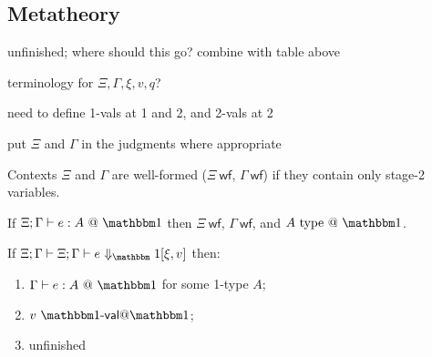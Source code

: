 \subsection{Metatheory}

\TODO unfinished; where should this go? combine with table above

\noindent\TODO terminology for $\Xi,\Gamma,\xi,v,q$?

\noindent\TODO need to define 1-vals at 1 and 2, and 2-vals at 2

\noindent\TODO put $\Xi$ and $\Gamma$ in the judgments where appropriate

\newcommand{\wf}{\ \mathsf{wf}}
\newcommand{\dom}[1]{\mathsf{dom}(#1)}
\newcommand{\valoo}{\ \bbone\textsf{-}\mathsf{val} @ \bbone}
\newcommand{\valot}{\ \bbone\textsf{-}\mathsf{val} @ \bbtwo}
\newcommand{\valtt}{\ \bbtwo\textsf{-}\mathsf{val} @ \bbtwo}

\begin{definition}
Contexts $\Xi$ and $\Gamma$ are well-formed ($\Xi\wf$, $\Gamma\wf$) if they
contain only stage-2 variables.
\end{definition}

\begin{theorem}
If $\Xi;\typesone e A$ then $\Xi\wf$, $\Gamma\wf$, and $A\istypeone$.
\end{theorem}

\begin{theorem}
If $\Xi;\Gamma\vdash\diaonesub$ then:
\begin{enumerate}
\item $\typesone e A$ for some 1-type $A$;
\item $v\valoo$;
\item \TODO unfinished
\end{enumerate}
\end{theorem}




